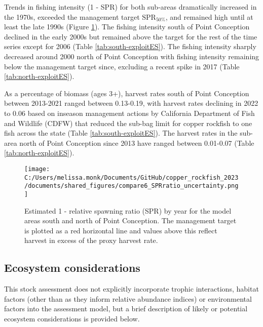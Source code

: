 \documentclass[11pt,
  letterpaper,
]{article}
\begin{document}
Trends in fishing intensity (1 - SPR) for both sub-areas dramatically increased in the 1970s, exceeded the management target \(\text{SPR}_{50\%}\), and remained high until at least the late 1990s (Figure \ref{fig:es-1-spr}). The fishing intensity south of Point Conception declined in the early 2000s but remained above the target for the rest of the time series except for 2006 (Table \ref{tab:south-exploitES}). The fishing intensity sharply decreased around 2000 north of Point Conception with fishing intensity remaining below the management target since, excluding a recent spike in 2017 (Table \ref{tab:north-exploitES}).

As a percentage of biomass (ages 3+), harvest rates south of Point Conception between 2013-2021 ranged between 0.13-0.19, with harvest rates declining in 2022 to 0.06 based on inseason management actions by California Department of Fish and Wildlife (CDFW) that reduced the sub-bag limit for copper rockfish to one fish across the state (Table \ref{tab:south-exploitES}). The harvest rates in the sub-area north of Point Conception since 2013 have ranged between 0.01-0.07 (Table \ref{tab:north-exploitES}).



\newpage



\begin{figure}
{\centering
\texttt{[image: C:/Users/melissa.monk/Documents/GitHub/copper\_rockfish\_2023/documents/shared\_figures/compare6\_SPRratio\_uncertainty.png]}
}
\caption{Estimated 1 - relative spawning ratio (SPR) by year for the model areas south and north of Point Conception. The management target is plotted as a red horizontal line and values above this reflect harvest in excess of the proxy harvest rate.\label{fig:es-1-spr}}
\end{figure}

\pagebreak

\subsection*{Ecosystem considerations}\label{ecosystem-considerations}

This stock assessment does not explicitly incorporate trophic interactions, habitat factors (other than as they inform relative abundance indices) or environmental factors into the assessment model, but a brief description of likely or potential ecosystem considerations is provided below.
\end{document}
